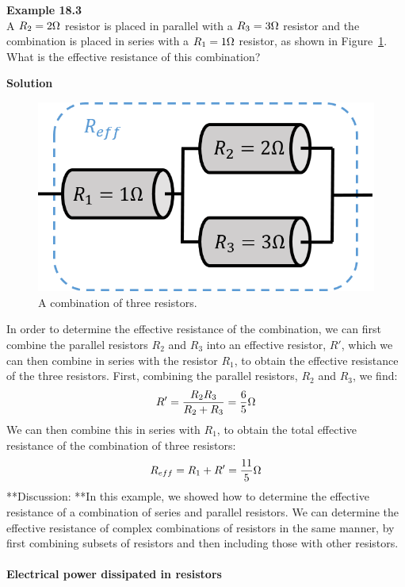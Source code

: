 \begin{framed}
\textbf{Example 18.3}\\
A $R_2=2 {\rm \Omega}$ resistor is placed in parallel with a $R_3=3 {\rm \Omega}$ resistor and the combination is placed in series with a $R_1=1 {\rm \Omega}$ resistor, as shown in Figure~\ref{fig:current:3resistors}. What is the effective resistance of this combination?

\begin{framed}
\textbf{Solution}\\
\begin{figure}[!htbp]
\centering
\includegraphics[width=0.4\linewidth]{files/3resistors-5f2efd2bb3dd619606b3f808340d707b.png}
\caption[]{A combination of three resistors.}
\label{fig:current:3resistors}
\end{figure}

In order to determine the effective resistance of the combination, we can first combine the parallel resistors $R_2$ and $R_3$ into an effective resistor, $R'$, which we can then combine in series with the resistor $R_1$, to obtain the effective resistance of the three resistors. First, combining the parallel resistors, $R_2$ and $R_3$, we find:
\begin{equation}
R'=\frac{R_2R_3}{R_2+R_3}=\frac{6}{5}{\rm\Omega}
\end{equation}
We can then combine this in series with $R_1$, to obtain the total effective resistance of the combination of three resistors:
\begin{equation}
R_{eff}=R_1+R'=\frac{11}{5}{\rm\Omega}
\end{equation}
**Discussion: **In this example, we showed how to determine the effective resistance of a combination of series and parallel resistors. We can determine the effective resistance of complex combinations of resistors in the same manner, by first combining subsets of resistors and then including those with other resistors.
\end{framed}
\end{framed}

\paragraph{Electrical power dissipated in resistors}

